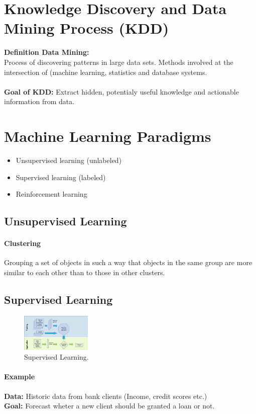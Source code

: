 \documentclass[../MLDM_Main.tex]{subfiles}
\begin{document}
\section{Knowledge Discovery and Data Mining Process (KDD)}
\textbf{Definition Data Mining:}\\
Process of discovering patterns in large data sets. Methods involved at the intersection of (machine learning, statistics and database systems.\\\\
\textbf{Goal of KDD:} Extract hidden, potentialy useful knowledge and actionable information from data.



\section{Machine Learning Paradigms}
\begin{itemize}
	\item Unsupervised learning (unlabeled)
	\item Supervised learning (labeled)
	\item Reinforcement learning
\end{itemize}

\subsection{Unsupervised Learning}
\paragraph{Clustering}
Grouping a set of objects in such a way that objects in the same group are more similar to each other than to those in other clusters.

\subsection{Supervised Learning}

\begin{figure}[H]
\centering
\includegraphics[width=0.3\textwidth]{images/SupervisedLearning.png}
\caption{\label{fig:Supervised Learning}Supervised Learning.}
\end{figure}
\paragraph{Example\\}
\textbf{Data:} Historic data from bank clients (Income, credit scores etc.)\\\textbf{Goal:} Forecast wheter a new client should be granted a loan or not.
\end{document}
